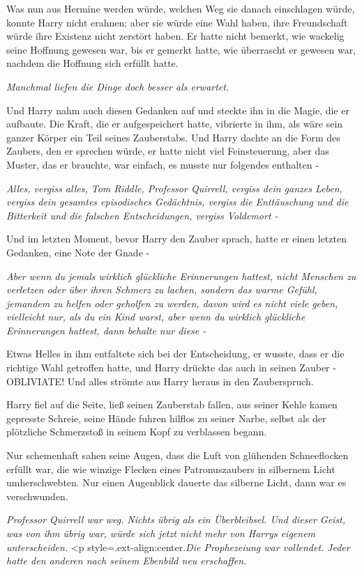 Was nun aus Hermine werden würde, welchen Weg sie danach einschlagen würde,
konnte Harry nicht erahnen; aber sie würde eine Wahl haben, ihre Freundschaft
würde ihre Existenz nicht zerstört haben. Er hatte nicht bemerkt, wie wackelig
seine Hoffnung gewesen war, bis er gemerkt hatte, wie überrascht er gewesen war,
nachdem die Hoffnung sich erfüllt hatte.

\emph{Manchmal liefen die Dinge doch besser als erwartet.}

Und Harry nahm auch diesen Gedanken auf und steckte ihn in die Magie, die er
aufbaute. Die Kraft, die er aufgespeichert hatte, vibrierte in ihm, als wäre
sein ganzer Körper ein Teil seines Zauberstabs. Und Harry dachte an die Form des
Zaubers, den er sprechen würde, er hatte nicht viel Feinsteuerung, aber das
Muster, das er brauchte, war einfach, es musste nur folgendes enthalten -

\emph{Alles, vergiss alles, Tom Riddle, Professor Quirrell, vergiss dein ganzes
Leben, vergiss dein gesamtes episodisches Gedächtnis, vergiss die Enttäuschung
und die Bitterkeit und die falschen Entscheidungen, vergiss Voldemort -}

Und im letzten Moment, bevor Harry den Zauber sprach, hatte er einen letzten
Gedanken, eine Note der Gnade -

\emph{Aber wenn du jemals wirklich glückliche Erinnerungen hattest, nicht
Menschen zu verletzen oder über ihren Schmerz zu lachen, sondern das warme
Gefühl, jemandem zu helfen oder geholfen zu werden, davon wird es nicht viele
geben, vielleicht nur, als du ein Kind warst, aber wenn du wirklich glückliche
Erinnerungen hattest, dann behalte nur diese -}

Etwas Helles in ihm entfaltete sich bei der Entscheidung, er wusste, dass er die
richtige Wahl getroffen hatte, und Harry drückte das auch in seinen Zauber -
\glqq{}OBLIVIATE!\grqq{} Und alles strömte aus Harry heraus in den Zauberspruch.

Harry fiel auf die Seite, ließ seinen Zauberstab fallen, aus seiner Kehle kamen
gepresste Schreie, seine Hände fuhren hilflos zu seiner Narbe, selbst als der
plötzliche Schmerzstoß in seinem Kopf zu verblassen begann.

Nur schemenhaft sahen seine Augen, dass die Luft von glühenden Schneeflocken
erfüllt war, die wie winzige Flecken eines Patronuszaubers in silbernem Licht
umherschwebten. Nur einen Augenblick dauerte das silberne Licht, dann war es
verschwunden.

\emph{Professor Quirrell war weg.}
\emph{Nichts übrig als ein
Überbleibsel. Und dieser Geist, was von ihm übrig war, würde sich jetzt nicht
mehr von Harrys eigenem unterscheiden.}   <p
style=\grqq{}.ext-align:center\grqq{}.\emph{Die Prophezeiung war vollendet.
}   \emph{Jeder hatte den anderen
nach seinem Ebenbild neu erschaffen.}

